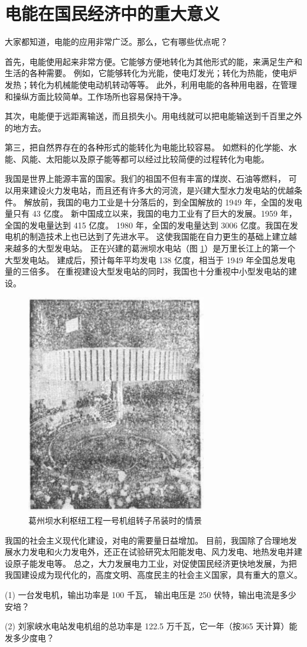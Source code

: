 \section{电能在国民经济中的重大意义}\label{sec:10-14}

大家都知道，电能的应用非常广泛。那么，它有哪些优点呢？

首先，电能使用起来非常方便。它能够方便地转化为其他形式的能，来满足生产和生活的各种需要。
例如，它能够转化为光能，使电灯发光；转化为热能，使电炉发热；转化为机械能使电动机转动等等。
此外，利用电能的各种用电器，在管理和操纵方面比较简单。工作场所也容易保持干净。

其次，电能便于远距离输送，而且损失小。用电线就可以把电能输送到千百里之外的地方去。

第三，把自然界存在的各种形式的能转化为电能比较容易。
如燃料的化学能、水能、风能、太阳能以及原子能等都可以经过比较简便的过程转化为电能。

我国是世界上能源丰富的国家。我们的祖国不但有丰富的煤炭、石油等燃料，
可以用来建设火力发电站，而且还有许多大的河流，是兴建大型水力发电站的优越条件。
解放前，我国的电力工业是十分落后的，到全国解放的 1949 年，全国的发电量只有 43 亿度。
新中国成立以来，我国的电力工业有了巨大的发展。1959 年，全国的发电量达到 415 亿度。
1980 年，全国的发电量达到 3006 亿度。我国在发电机的制造技术上也已达到了先进水平。
这使我国能在自力更生的基础上建立越来越多的大型发电站。
正在兴建的葛洲坝水电站（图 \ref{fig:10-49}）是万里长江上的第一个大型发电站。
建成后，预计每年平均发电 138 亿度，相当于 1949 年全国总发电量的三倍多。
在重视建设大型发电站的同时，我国也十分重视中小型发电站的建设。

\begin{figure}[H]%
    \centering
    \includegraphics[width=0.7\textwidth]{../pic/czwl2-ch10-49}
    \caption{葛州坝水利枢纽工程一号机组转子吊装时的情景}\label{fig:10-49}
\end{figure}

我国的社会主义现代化建设，对电的需要量日益增加。
目前，我国除了合理地发展水力发电和火力发电外，还正在试验研究太阳能发电、风力发电、地热发电并建设原子能发电等。
总之，大力发展电力工业，对促使国民经济更快地发展，为把我国建设成为现代化的，高度文明、高度民主的社会主义国家，具有重大的意义。


\lianxi

(1) 一台发电机，输出功率是 100 千瓦， 输出电压是 250 伏特，输出电流是多少安培？

(2) 刘家峡水电站发电机组的总功率是 122.5 万千瓦，它一年（按365 天计算）能发多少度电？

